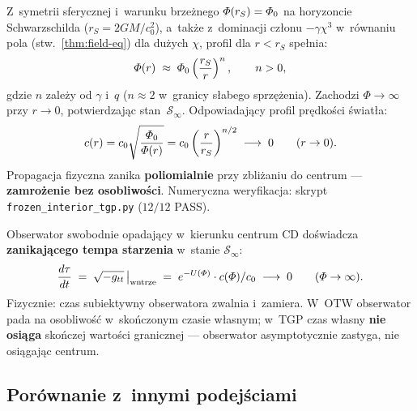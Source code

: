 \begin{remark}\label{rem:Phi-interior}
Z~symetrii sferycznej i~warunku brze\.znego $\varPhi(r_S) = \varPhi_0$
na horyzoncie Schwarzschilda ($r_S = 2GM/c_0^2$), a~tak\.ze
z~dominacji cz\l{}onu $-\gamma\chi^3$ w~r\'ownaniu pola
(stw.~\ref{thm:field-eq}) dla du\.zych $\chi$, profil
dla $r < r_S$ spe\l{}nia:
\begin{equation}\label{eq:Phi-interior-profile}
  \varPhi(r) \;\approx\; \varPhi_0 \left(\frac{r_S}{r}\right)^n,
  \qquad n > 0,
\end{equation}
gdzie $n$ zale\.zy od $\gamma$ i~$q$ ($n \approx 2$ w~granicy s\l{}abego
sprz\k{e}\.zenia). Zachodzi $\Phi \to \infty$ przy $r \to 0$,
potwierdzaj\k{a}c stan~$\mathcal{S}_\infty$.
Odpowiadaj\k{a}cy profil pr\k{e}dko\'sci \'swiat\l{}a:
\begin{equation}\label{eq:c-interior}
  c(r) = c_0 \sqrt{\frac{\varPhi_0}{\varPhi(r)}}
       = c_0 \left(\frac{r}{r_S}\right)^{n/2}
  \;\longrightarrow\; 0
  \qquad (r \to 0).
\end{equation}
Propagacja fizyczna zanika \textbf{poliomialnie} przy zbli\.zaniu
do centrum --- \textbf{zamro\.zenie bez osobliwo\'sci}.
Numeryczna weryfikacja: skrypt
\texttt{frozen\_interior\_tgp.py} ($12/12$ PASS).
\end{remark}

\begin{proposition}\label{prop:proper-time-infty}
Obserwator swobodnie opadaj\k{a}cy w~kierunku centrum CD
do\'swiadcza \textbf{zanikaj\k{a}cego tempa starzenia}
w~stanie $\mathcal{S}_\infty$:
\begin{equation}\label{eq:proper-time-infty}
  \frac{d\tau}{dt}
  \;=\; \sqrt{-g_{tt}}\,\big|_{\mathrm{wn\k{e}trze}}
  \;=\; e^{-U(\Phi)}\cdot c(\Phi)/c_0
  \;\longrightarrow\; 0
  \qquad (\Phi \to \infty).
\end{equation}
Fizycznie: czas subiektywny obserwatora zwalnia i~zamiera.
W~OTW obserwator pada na osobliwo\'s\'c w~sko\'nczonym czasie w\l{}asnym;
w~TGP czas w\l{}asny \textbf{nie osi\k{a}ga} sko\'nczej warto\'sci
granicznej --- obserwator asymptotycznie zastyga,
nie osi\k{a}gaj\k{a}c centrum.
\end{proposition}

\subsection{Por\'ownanie z~innymi podej\'sciami}\label{ssec:cd-inne}

